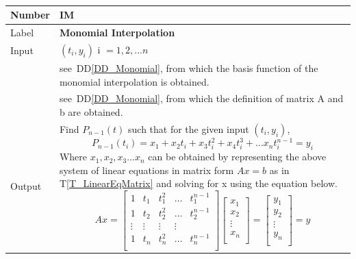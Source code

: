 \documentclass[12pt]{article}
\newcommand{\colAwidth}{0.13\textwidth}
\newcommand{\colBwidth}{0.82\textwidth}
\newcommand{\ddref}[1]{DD\ref{#1}}
\newcommand{\tref}[1]{T\ref{#1}}
\newcounter{instnum} %
\begin{document}

~\newline
\noindent
\begin{minipage}{\textwidth}
	\renewcommand*{\arraystretch}{1.5}
	\begin{tabular}{| p{\colAwidth} | p{\colBwidth}|}
		\hline
		\rowcolor[gray]{0.9}
		Number
		& IM{instnum}\theinstnum \label{IM_Monomial}\\
		\hline
		
		Label
		& \bf Monomial Interpolation\\
		\hline
		
		Input
		& $(t_i,y_i)$ i $= {1,2,...n}$\\
		& see~\ddref{DD_Monomial}, from which the basis function of the monomial interpolation is obtained.\\
		& see~\ddref{DD_Monomial}, from which the definition of matrix A and b are obtained.\\
		\hline
		
		Output
		&Find $P_{n-1}(t)$ such that for the given input $(t_i,y_i)$,
		\begin{equation*}
		P_{n-1}(t_i) = x_1 + x_2 t_i + x_3 t_i ^2 + x_4 t_i ^3 + ... x_n t_i ^{n-1} = y_i 
		\end{equation*}
		Where $x_1, x_2, x_3 ... x_n$ can be obtained by representing the above system of linear equations in matrix form $Ax = b$ as in \tref{T_LinearEqMatrix} and solving for x using the equation below.
		\begin{equation*}
		Ax = \begin{bmatrix}
		1 & t_{1} & t_{1} ^2 & \dots & t_{1} ^{n-1} \\
		1 & t_{2} & t_{2} ^2 & \dots & t_{2} ^{n-1} \\
		\vdots & \vdots & \vdots & \vdots \\
		1 & t_{n} & t_{n} ^2 & \dots & t_{n} ^{n-1} \\
		\end{bmatrix}
		\begin{bmatrix}
		x_1  \\
		x_2 \\
		\vdots \\
		x_n \\
		\end{bmatrix} = 
		\begin{bmatrix}
		y_1  \\
		y_2 \\
		\vdots \\
		y_n \\
		\end{bmatrix} = y
		\end{equation*}\\ 
	

\end{tabular}
\end{minipage}
\end{document}
